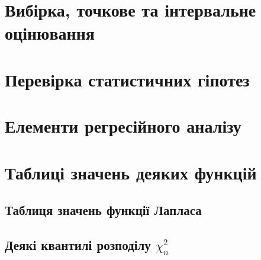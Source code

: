\documentclass{report}
\begin{document}
    \chapter{Вибірка, точкове та інтервальне оцінювання}
        
        
        
    \chapter{Перевірка статистичних гіпотез}
        
        
        
    \chapter{Елементи регресійного аналізу}
        
        
    \chapter*{Таблиці значень деяких функцій}
    \section*{Таблиця значень функції Лапласа}
        \newpage
    \section*{Деякі квантилі розподілу $\chi^2_{n}$}
        \newpage
\end{document}
